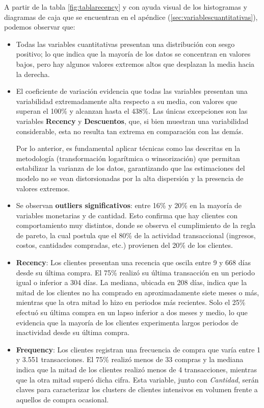 A partir de la tabla \ref{fig:tablarecency} y con ayuda visual de los histogramas y diagramas de caja que se encuentran en el apéndice (\ref{sec:variablescuantitativas}), podemos observar que:
    \begin{itemize}
    \item Todas las variables cuantitativas presentan una distribución con sesgo positivo; lo que indica que la mayoría de los datos se concentran en valores bajos, pero hay algunos valores extremos altos que desplazan la media hacia la derecha.
    \item El coeficiente de variación evidencia que todas las variables presentan una variabilidad extremadamente alta respecto a su media, con valores que superan el 100\% y alcanzan hasta el 438\%. Las únicas excepciones son las variables \textbf{Recency} y \textbf{Descuentos}, que, si bien muestran una variabilidad considerable, esta no resulta tan extrema en comparación con las demás.
     
    Por lo anterior, es fundamental aplicar técnicas como las descritas en la metodología (transformación logarítmica o winsorización) que permitan estabilizar la varianza de los datos, garantizando que las estimaciones del modelo no se vean distorsionadas por la alta dispersión y la presencia de valores extremos.
     \item Se observan \textbf{outliers significativos}: entre 16\% y 20\% en la mayoría de variables monetarias y de cantidad. Esto confirma que hay clientes con comportamiento muy distintos, donde se observa el cumplimiento de la regla de pareto, la cual postula que el 80\% de la actividad transaccional (ingresos, costos, cantidades compradas, etc.) provienen del 20\% de los clientes.

    \item \textbf{Recency}: Los clientes presentan una recencia que oscila entre 9 y 668 días desde su última compra. El 75\% realizó su última transacción en un periodo igual o inferior a 304 días. La mediana, ubicada en 208 días, indica que la mitad de los clientes no ha comprado en aproximadamente siete meses o más, mientras que la otra mitad lo hizo en periodos más recientes. Solo el 25\% efectuó su última compra en un lapso inferior a dos meses y medio, lo que evidencia que la mayoría de los clientes experimenta largos periodos de inactividad desde su última compra.
    
    \item \textbf{Frequency}: Los clientes registran una frecuencia de compra que varía entre 1 y 3.551 transacciones. El 75\% realizó menos de 33 compras y la mediana indica que la mitad de los clientes realizó menos de 4 transacciones, mientras que la otra mitad superó dicha cifra. Esta variable, junto con \textit{Cantidad}, serán claves para caracterizar los clusters de clientes intensivos en volumen frente a aquellos de compra ocasional.
    

\end{itemize}
